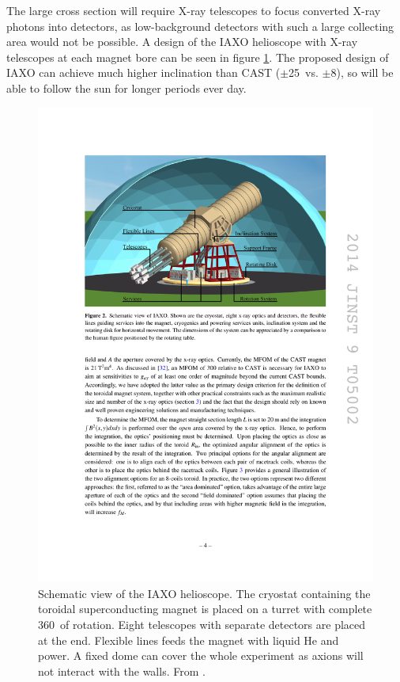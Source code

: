 The large cross section will require X-ray telescopes to focus converted X-ray photons into detectors, as low-background detectors with such a large collecting area would not be possible. A design of the IAXO helioscope\cite{Vogel:2013we,Shilon:1501687,Irastorza:2012tt} with X-ray telescopes at each magnet bore can be seen in figure \ref{fig:iaxo_helioscope}. The proposed design of IAXO can achieve much higher inclination than CAST ($\pm$25\degr\ vs. $\pm$8\degr), so will be able to follow the sun for longer periods ever day.

\begin{figure}[!h]
  \center
\includegraphics[width=0.8\linewidth]{figures/iaxo/iaxo_helioscope.pdf}
\caption{\footnotesize Schematic view of the IAXO helioscope. The cryostat containing the toroidal superconducting magnet is placed on a turret with complete 360\degr\ of rotation. Eight telescopes with separate detectors are placed at the end. Flexible lines feeds the magnet with liquid He and power. A fixed dome can cover the whole experiment as axions will not interact with the walls. From \cite{Armengaud:2014eo}.}\label{fig:iaxo_helioscope}
\end{figure}

